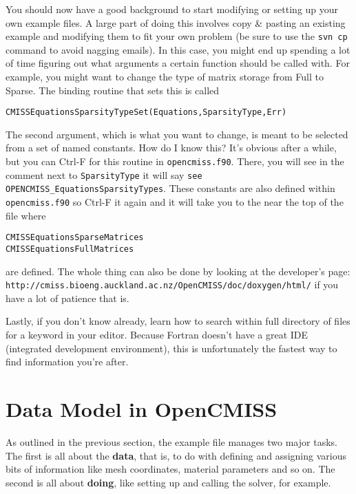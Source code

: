 You should now have a good background to start modifying or setting up your own example files. 
A large part of doing this involves copy \& pasting an existing example and modifying them to fit
your own problem (be sure to use the \texttt{svn cp} command to avoid nagging emails). In this case,
you might end up spending a lot of time figuring out what arguments a certain function should be called 
with. For example, you might want to change the type of matrix storage from Full to Sparse. The 
binding routine that sets this is called
\begin{lstlisting}
CMISSEquationsSparsityTypeSet(Equations,SparsityType,Err)
\end{lstlisting}
The second argument, which is what you want to change, is meant to be selected from a set of named
constants. How do I know this? It's obvious after a while, but you can Ctrl-F for this routine in 
\texttt{opencmiss.f90}. There, you will see in the comment next to \texttt{SparsityType} it will say
\texttt{see OPENCMISS\_EquationsSparsityTypes}. These constants are also defined within 
\texttt{opencmiss.f90} so Ctrl-F it again and it will take you to the near the top of the file where
\begin{lstlisting}
CMISSEquationsSparseMatrices
CMISSEquationsFullMatrices
\end{lstlisting}
are defined. The whole thing can also be done by looking at the developer's page:\\
\texttt{http://cmiss.bioeng.auckland.ac.nz/OpenCMISS/doc/doxygen/html/}
if you have a lot of patience that is.

Lastly, if you don't know already, learn how to search within full directory of files for a keyword 
in your editor. Because Fortran doesn't have a great IDE (integrated development environment), this
is unfortunately the fastest way to find information you're after.


\section{Data Model in OpenCMISS}
\label{sec:devel_datamodel}

As outlined in the previous section, the example file manages two major tasks. The first is all about the 
\textbf{data}, that is, to do with defining and assigning various bits of information like mesh 
coordinates, material parameters and so on. The second is all about \textbf{doing}, like setting up 
and calling the solver, for example.

